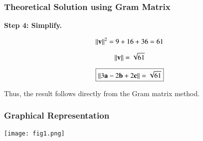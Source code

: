 \documentclass{beamer}
\begin{document}
\begin{frame}[fragile]
\frametitle{Theoretical Solution using Gram Matrix}
\textbf{Step 4: Simplify.}

\[
\left\lVert\mathbf{v}\right\rVert^2 = 9 + 16 + 36 = 61
\]

\[
\left\lVert\mathbf{v}\right\rVert = \sqrt{61}
\]

\[
\boxed{\left\lVert3\mathbf{a} - 2\mathbf{b} + 2\mathbf{c}\right\rVert = \sqrt{61}}
\]

Thus, the result follows directly from the Gram matrix method.
\end{frame}





\begin{frame}
\frametitle{Graphical Representation}
\begin{center}
\texttt{[image: fig1.png]}
\end{center}
\end{frame}
\end{document}
